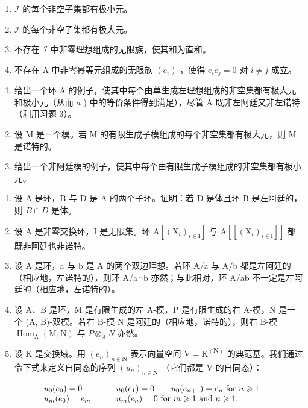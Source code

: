 \begin{enumerate}
\def\labelenumi{(\roman{enumi})}
\item
  \(\mathcal{I}\) 的每个非空子集都有极小元。
\item
  \(\mathcal{I}\) 的每个非空子集都有极大元。
\item
  不存在 \(\mathcal{I}\) 中非零理想组成的无限族，使其和为直和。
\item
  不存在 A 中非零幂等元组成的无限族 \((e_i)\) ，使得 \(e_i e_j = 0\) 对 \(i \neq j\) 成立。
\end{enumerate}

\begin{enumerate}
\def\labelenumi{\alph{enumi})}
\setcounter{enumi}{1}
\item
  给出一个环 A 的例子，使其中每个由单生成左理想组成的非空集都有极大元和极小元（从而 \(a\) ) 中的等价条件得到满足），尽管 A 既非左阿廷又非左诺特（利用习题 3）。
\item
  设 M 是一个模。若 M 的有限生成子模组成的每个非空集都有极大元，则 M 是诺特的。
\item
  给出一个非阿廷模的例子，使其中每个由有限生成子模组成的非空集都有极小元。
\end{enumerate}

\begin{enumerate}
\def\labelenumi{\arabic{enumi})}
\setcounter{enumi}{7}
\item
  设 A 是环，B 与 D 是 A 的两个子环。证明：若 D 是体且环 B 是左阿廷的，则 \(B \cap D\) 是体。
\item
  设 A 是非零交换环，I 是无限集。环 \(\mathrm{A}[(\mathrm{X}_{i})_{i\in\mathrm{I}}]\) 与 \(\mathrm{A}[[(\mathrm{X}_{i})_{i\in\mathrm{I}}]]\) 都既非阿廷也非诺特。
\item
  设 A 是环，a 与 b 是 A 的两个双边理想。若环 A/a 与 A/b 都是左阿廷的（相应地，左诺特的），则环 A/a∩b 亦然；与此相对，环 A/ab 不一定是左阿廷的（相应地，左诺特的）。
\item
  设 A、B 是环，M 是有限生成的左 A-模，P 是有限生成的右 A-模，N 是一个 (A, B)-双模。若右 B-模 N 是阿廷的（相应地，诺特的），则右 B-模 \(\operatorname{Hom}_{\mathrm{A}}(\mathrm{M}, \mathrm{N})\) 与 \(P \otimes_{A} N\) 亦然。
\item
  设 \(\mathrm{K}\) 是交换域。用 \((e_n)_{n\in \mathbf{N}}\) 表示向量空间 \(\mathrm{V} = \mathrm{K}^{(\mathbf{N})}\) 的典范基。我们通过令下式来定义自同态的序列 \((u_n)_{n\in \mathbf{N}}\) （它们都是 \(\mathrm{V}\) 的自同态）：
\end{enumerate}

\[
\begin{array}{l l} u _ {0} (e _ {0}) = 0 & \qquad u _ {0} (e _ {1}) = 0 \qquad u _ {0} (e _ {n + 1}) = e _ {n} \text { for } n \geqslant 1 \\ u _ {m} (e _ {0}) = e _ {m} & \qquad u _ {m} (e _ {n}) = 0 \text { for } m \geqslant 1 \text { and } n \geqslant 1. \end{array}
\]

